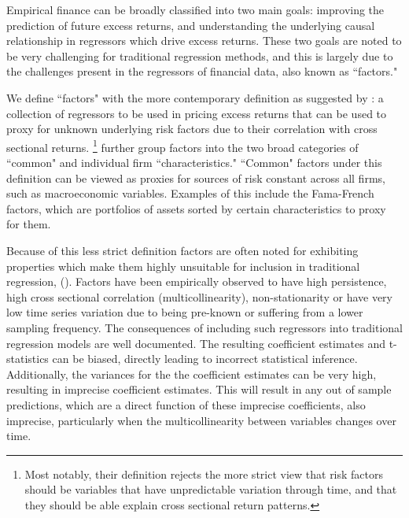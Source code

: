 \documentclass[11pt, a4paper, table]{article}
\begin{document}
Empirical finance can be broadly classified into two main goals: improving the prediction of future excess returns, and understanding the underlying causal relationship in regressors which drive excess returns. These two goals are noted to be very challenging for traditional regression methods, and this is largely due to the challenges present in the regressors of financial data, also known as ``factors." 

We define ``factors" with the more contemporary definition as suggested by \cite{harvey__2016}: a collection of regressors to be used in pricing excess returns that can be used to proxy for unknown underlying risk factors due to their correlation with cross sectional returns. \footnote{Most notably, their definition rejects the more strict view that risk factors should be variables that have unpredictable variation through time, and that they should be able explain cross sectional return patterns.} \cite{harvey__2016} further group factors into the two broad categories of ``common" and individual firm ``characteristics." ``Common" factors under this definition can be viewed as proxies for sources of risk constant across all firms, such as macroeconomic variables. Examples of this include the Fama-French factors, which are portfolios of assets sorted by certain characteristics to proxy for them. 

Because of this less strict definition factors are often noted for exhibiting properties which make them highly unsuitable for inclusion in traditional regression, (\cite{harvey__2016}). Factors have been empirically observed to have high persistence, high cross sectional correlation (multicollinearity), non-stationarity or have very low time series variation due to being pre-known or suffering from a lower sampling frequency. The consequences of including such regressors into traditional regression models are well documented. The resulting coefficient estimates and t-statistics can be biased, directly leading to incorrect statistical inference. Additionally, the variances for the the coefficient estimates can be very high, resulting in imprecise coefficient estimates. This will result in any out of sample predictions, which are a direct function of these imprecise coefficients, also imprecise, particularly when the multicollinearity between variables changes over time.
\end{document}
